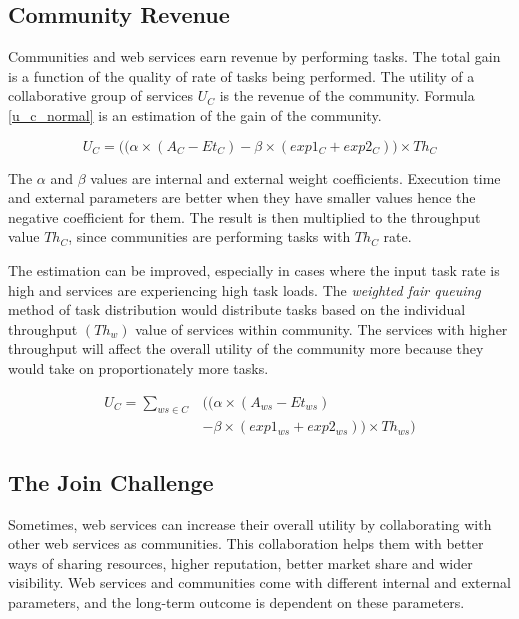 \documentclass[10pt,journal,cspaper,compsoc]{IEEEtran}
\begin{document}
\subsection{Community Revenue}

Communities and web services earn revenue by performing tasks. The total gain is a function of the quality of rate of tasks being performed. The utility of a collaborative group of services $U_{C}$ is the revenue of the community. Formula \ref{u_c_normal} is an estimation of the gain of the community.

\begin{equation}\label{u_c_normal}
U_{C} = \big((\alpha \times (A_{C} - Et_{C}) - \beta \times (exp1_{C} + exp2_{C})\big) \times Th_{C}
\end{equation}

The $\alpha$ and $\beta$ values are internal and external weight coefficients. Execution time and external parameters are better when they have smaller values hence the negative coefficient for them. The result is then multiplied to the throughput value $Th_{C}$, since communities are performing tasks with $Th_{C}$ rate.

The estimation can be improved, especially in cases where the input task rate is high and services are experiencing high task loads. The \emph{weighted fair queuing} method of task distribution would distribute tasks based on the individual throughput $(Th_{w})$ value of services within community. The services with higher throughput will affect the overall utility of the community more because they would take on proportionately more tasks.

\begin{equation}\label{u_c_load}
\begin{split}
U_{C} = \sum_{ws \in C}&\bigg(\big(\alpha \times (A_{ws} - Et_{ws}) \\
        & - \beta \times (exp1_{ws} + exp2_{ws})\big) \times Th_{ws}\bigg)
\end{split}
\end{equation}

\subsection{The Join Challenge}\label{s:tjc}
Sometimes, web services can increase their overall utility by collaborating with other web services as communities. This collaboration helps them with better ways of sharing resources, higher reputation, better market share and wider visibility. Web services and communities come with different internal and external parameters, and the long-term outcome is dependent on these parameters. 
\end{document}
